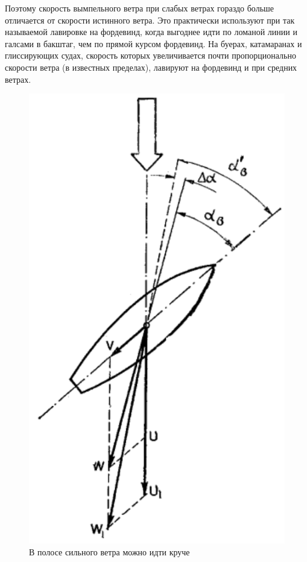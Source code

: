 \documentclass[a4paper, 12pt, twoside, final]{scrbook}
\begin{document}
Поэтому скорость вымпельного ветра при слабых ветрах гораздо больше отличается от скорости истинного ветра. Это практически используют при так называемой лавировке на фордевинд, когда выгоднее идти по ломаной линии и галсами в бакштаг, чем по прямой курсом фордевинд. На буерах, катамаранах и глиссирующих судах, скорость которых увеличивается почти пропорционально скорости ветра (в известных пределах), лавируют на фордевинд и при средних ветрах.

\begin{figure}
	\centering
	\includegraphics[scale=1]{92_V_polose_silnogo_vetra}
	\caption{В полосе сильного ветра можно идти круче}
	\label{fig:92}
\end{figure}
\end{document}
